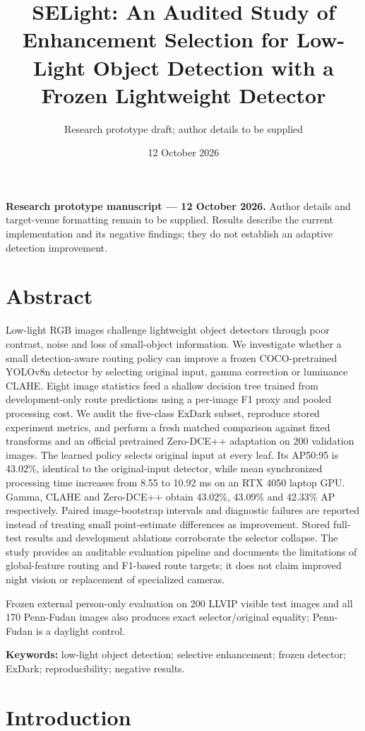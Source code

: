 \documentclass[11pt,a4paper]{article}
\title{SELight: An Audited Study of Enhancement Selection for Low-Light Object Detection with a Frozen Lightweight Detector}\author{Research prototype draft; author details to be supplied}\date{12 October 2026}
\begin{document}
\maketitle

\textbf{Research prototype manuscript --- 12 October 2026.} Author details and target-venue formatting remain to be supplied. Results describe the current implementation and its negative findings; they do not establish an adaptive detection improvement.


\section{Abstract}

Low-light RGB images challenge lightweight object detectors through poor contrast, noise and loss of small-object information. We investigate whether a small detection-aware routing policy can improve a frozen COCO-pretrained YOLOv8n detector by selecting original input, gamma correction or luminance CLAHE. Eight image statistics feed a shallow decision tree trained from development-only route predictions using a per-image F1 proxy and pooled processing cost. We audit the five-class ExDark subset, reproduce stored experiment metrics, and perform a fresh matched comparison against fixed transforms and an official pretrained Zero-DCE++ adaptation on 200 validation images. The learned policy selects original input at every leaf. Its AP50:95 is 43.02\%, identical to the original-input detector, while mean synchronized processing time increases from 8.55 to 10.92 ms on an RTX 4050 laptop GPU. Gamma, CLAHE and Zero-DCE++ obtain 43.02\%, 43.09\% and 42.33\% AP respectively. Paired image-bootstrap intervals and diagnostic failures are reported instead of treating small point-estimate differences as improvement. Stored full-test results and development ablations corroborate the selector collapse. The study provides an auditable evaluation pipeline and documents the limitations of global-feature routing and F1-based route targets; it does not claim improved night vision or replacement of specialized cameras.


 Frozen external person-only evaluation on 200 LLVIP visible test images and all 170 Penn-Fudan images also produces exact selector/original equality; Penn-Fudan is a daylight control.


\textbf{Keywords:} low-light object detection; selective enhancement; frozen detector; ExDark; reproducibility; negative results.


\section{Introduction}
\end{document}
